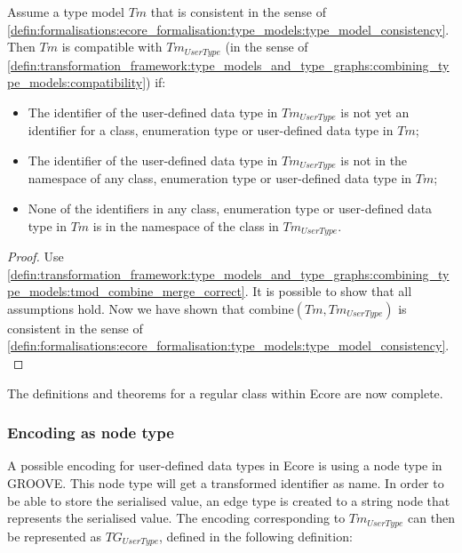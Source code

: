 \begin{thm}
\label{defin:library_of_transformations:type_level_transformations:user_defined_data_types:tmod_userdatatype_combine_correct}
Assume a type model $Tm$ that is consistent in the sense of \cref{defin:formalisations:ecore_formalisation:type_models:type_model_consistency}. Then $Tm$ is compatible with $Tm_{UserType}$ (in the sense of \cref{defin:transformation_framework:type_models_and_type_graphs:combining_type_models:compatibility}) if:
\begin{itemize}
    \item The identifier of the user-defined data type in $Tm_{UserType}$ is not yet an identifier for a class, enumeration type or user-defined data type in $Tm$;
    \item The identifier of the user-defined data type in $Tm_{UserType}$ is not in the namespace of any class, enumeration type or user-defined data type in $Tm$;
    \item None of the identifiers in any class, enumeration type or user-defined data type in $Tm$ is in the namespace of the class in $Tm_{UserType}$.
\end{itemize}
\end{thm}

\begin{proof}
Use \cref{defin:transformation_framework:type_models_and_type_graphs:combining_type_models:tmod_combine_merge_correct}. It is possible to show that all assumptions hold. Now we have shown that $\mathrm{combine}(Tm, Tm_{UserType})$ is consistent in the sense of \cref{defin:formalisations:ecore_formalisation:type_models:type_model_consistency}.
\end{proof}

The definitions and theorems for a regular class within Ecore are now complete. 

\subsubsection{Encoding as node type}

A possible encoding for user-defined data types in Ecore is using a node type in GROOVE. This node type will get a transformed identifier as name. In order to be able to store the serialised value, an edge type is created to a string node that represents the serialised value. The encoding corresponding to $Tm_{UserType}$ can then be represented as $TG_{UserType}$, defined in the following definition:

